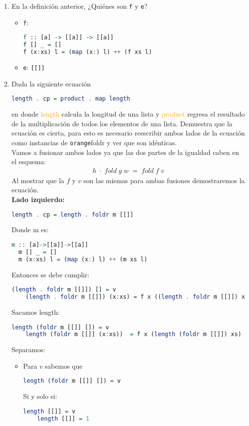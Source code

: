\documentclass[spanish,12pt,letterpaper]{article}
\begin{document}
\begin{enumerate}
\item En la definición anterior, ¿Quiénes son \texttt{f} y \texttt{e}?
\begin{itemize}
\item \texttt{f}:
		\begin{lstlisting}[language=Haskell]
f :: [a] -> [[a]] -> [[a]]
f [] _ = []
f (x:xs) l = (map (x:) l) ++ (f xs l)\end{lstlisting}
\item \texttt{e}: \texttt{[[]]}
\end{itemize}

\item Dada la siguiente ecuación
  \begin{lstlisting}[language=Haskell]
    length . cp = product . map length\end{lstlisting}
  en donde \textcolor{orange}{length} calcula la longitud de una lista y
  \textcolor{orange}{product} regresa el resultado de la multiplicación de todos
  los elementos de una lista. Demuestra que la ecuación es cierta, para esto es
  necesario reescribir ambos lados de la ecuación como instancias de \texttt
  {orange}{foldr} y ver que son idénticas.\\

  \noindent Vamos a fusionar ambos lados ya que las dos partes de la igualdad
  caben en el esquema:
  \begin{align*}
	h\;\cdot\;fold\;g\;w\;=\;fold\;f\;v
  \end{align*}
  Al mostrar que la $f$ y $v$ son las mismas para ambas fusiones demostraremos
  la ecuación.\\

  \textbf{Lado izquierdo:}
  \begin{lstlisting}[language=Haskell]
    length . cp = length . foldr m [[]]\end{lstlisting}
Donde m es:
  \begin{lstlisting}[language=Haskell]
  m :: [a]->[[a]]->[[a]]
  m [] _ = []
  m (x:xs) l = (map (x:) l) ++ (m xs l)\end{lstlisting}
  Entonces se debe cumplir:
  \begin{lstlisting}[language=Haskell]
    (length . foldr m [[]]) [] = v
    (length . foldr m [[]]) (x:xs) = f x ((length . foldr m [[]]) xs)\end{lstlisting}
  Sacamos length:
  \begin{lstlisting}[language=Haskell]
    length (foldr m [[]] []) = v
    length (foldr m [[]] (x:xs))  = f x (length (foldr m [[]]) xs)\end{lstlisting}
    Separamos:
    \begin{itemize}
    \item Para $v$ sabemos que
    \begin{lstlisting}[language=Haskell]
    length (foldr m [[]] []) = v\end{lstlisting}
    Si y solo si:
    \begin{lstlisting}[language=Haskell]
    length [[]] = v
    length [[]] = 1\end{lstlisting}


\end{itemize}
\end{enumerate}
\end{document}
